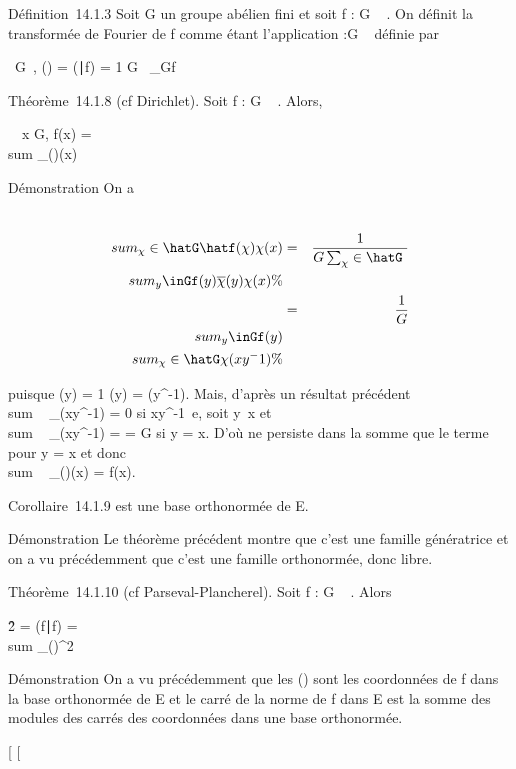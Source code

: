 \documentclass[]{article}
\begin{document}
Définition~14.1.3 Soit G un groupe abélien fini et soit f : G \rightarrow~ . On
définit la transformée de Fourier de f comme étant l'application
\hatf :\hat G \rightarrow~  définie par

\forall~\chi \in\hat G~,
\hatf(\chi) = (\chi∣f) =
1\over
G\int ~
_Gf\overline\chi

Théorème~14.1.8 (cf Dirichlet). Soit f : G \rightarrow~ . Alors,

\forall~~x \in G, f(x) = \\sum
_\chi\in\hatG\hatf(\chi)\chi(x)

Démonstration On a

\begin{align*} \\sum
_\chi\in\hatG\hatf(\chi)\chi(x)&
=& 1 \over G
\sum _\chi\in\hatG~
\\sum
_y\inGf(y)\overline\chi(y)\chi(x)\%&
\\ & =& 1 \over
G \\sum
_y\inGf(y)\\sum
_\chi\in\hatG\chi(xy^-1) \%&
\\ \end{align*}

puisque \overline\chi(y) = 1 \over
\chi(y) = \chi(y^-1). Mais, d'après un résultat précédent
\\sum ~
_\chi\in\hatG\chi(xy^-1) = 0 si
xy^-1\neq~e, soit
y\neq~x et
\\sum ~
_\chi\in\hatG\chi(xy^-1) =
\hatG = G si
y = x. D'où ne persiste dans la somme que le terme pour y = x et donc
\\sum ~
_\chi\in\hatG\hatf(\chi)\chi(x) =
f(x).

Corollaire~14.1.9 \hatG est une base orthonormée de
E.

Démonstration Le théorème précédent montre que c'est une famille
génératrice et on a vu précédemment que c'est une famille orthonormée,
donc libre.

Théorème~14.1.10 (cf Parseval-Plancherel). Soit f : G \rightarrow~ . Alors

\f\^2 =
(f∣f) = \\sum
_\chi\in\hatG\hatf(\chi)^2

Démonstration On a vu précédemment que les \hatf(\chi)
sont les coordonnées de f dans la base orthonormée
\hatG de E et le carré de la norme de f dans E est la
somme des modules des carrés des coordonnées dans une base orthonormée.

{[}
{[}
\end{document}
